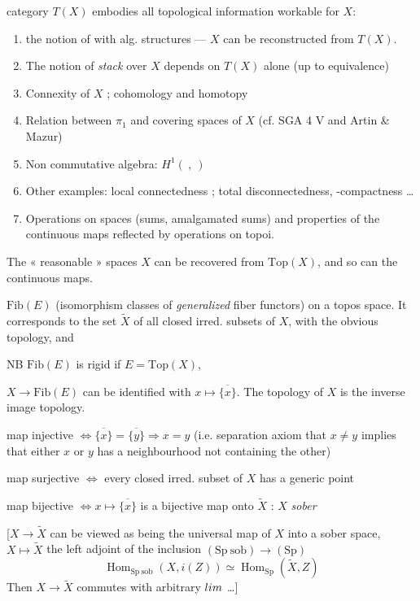 \documentclass[11pt,a4paper]{article}
\begin{document}
 category $T(X)$ embodies all topological information
workable for $X$:
\begin{enumerate}
\item[a)] the notion of  with alg. structures --- $X$ can be
reconstructed from $T(X)$.
\item[b)] The notion of \emph{stack} over $X$ depends on $T(X)$ alone (up to
equivalence)
\item[c)] Connexity of $X$ ; \struck{\ill{}} cohomology and homotopy
\item[d)] Relation  between $\pi_{1}$ and covering spaces of
$X$ \quad (cf. SGA 4 V and Artin \& Mazur)
\item[e)] Non commutative  algebra: $H^{1}(\ ,\ )$
\item[f)] Other examples: local connectedness ; total disconnectedness,
-compactness …
\item[g)] Operations on spaces (sums, amalgamated sums) and properties of the
continuous maps reflected by operations on topoi.
\end{enumerate}

The « reasonable » spaces $X$ can be recovered from $\mathrm{Top}(X)$, and so can
the continuous maps.

$\mathrm{Fib}(E)$ (isomorphism classes of \emph{generalized} fiber functors) on a
topos space. It corresponds to the set $\widetilde{X}$ of all closed irred.
subsets of $X$, with the obvious topology, and

NB $\mathrm{Fib}(E)$ is rigid if $E = \mathrm{Top}(X)$,

$X \to \mathrm{Fib}(E)$ can be identified with $x \mapsto \overline{\{x\}}$. The
topology of $X$ is the inverse image topology.

map injective $\iff \overline{\{x\}} = \overline{\{y\}} \Rightarrow x = y$ (i.e.
separation axiom that $x \neq y$ implies that either $x$ or $y$ has a
neighbourhood not containing the other)

map surjective $\iff$ every closed irred. subset of $X$ has a generic point

 map bijective $\iff x \mapsto \overline{\{x\}}$ is a bijective
map onto $\widetilde{X}$ : \quad $X$ \emph{sober}

[$X \to \widetilde{X}$ can be viewed as being the universal map of $X$ into a
sober space, $X \mapsto \widetilde{X}$ the left adjoint of the inclusion
$(\mathrm{Sp\ sob}) \longrightarrow (\mathrm{Sp})$
\[
\operatorname{Hom}_{\mathrm{Sp\ sob}}(X, i(Z)) \simeq
\operatorname{Hom}_{\mathrm{Sp}}(\widetilde{X}, Z)
\]
Then $X \to \widetilde{X}$ commutes with arbitrary $\varprojlim$ …]
\end{document}
